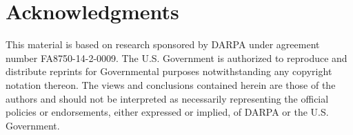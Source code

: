 \section*{Acknowledgments}

This material is based on research sponsored by DARPA under agreement number FA8750-14-2-0009. The U.S. Government is authorized to reproduce and distribute reprints for Governmental purposes notwithstanding any copyright notation thereon. The views and conclusions contained herein are those of the authors and should not be interpreted as necessarily representing the official policies or endorsements, either expressed or implied, of DARPA or the U.S. Government.

